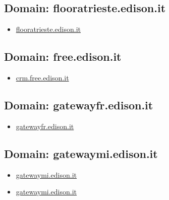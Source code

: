 \documentclass{article}
\begin{document}
    \subsection{Domain: flooratrieste.edison.it}
    \begin{itemize}
        
            
                
                \item \href{ http://flooratrieste.edison.it/}{ flooratrieste.edison.it }
            
        
    \end{itemize}

    \subsection{Domain: free.edison.it}
    \begin{itemize}
        
            
                
                \item \href{ http://crm.free.edison.it/}{ crm.free.edison.it }
            
        
    \end{itemize}

    \subsection{Domain: gatewayfr.edison.it}
    \begin{itemize}
        
            
                
                \item \href{ http://gatewayfr.edison.it/}{ gatewayfr.edison.it }
            
        
    \end{itemize}

    \subsection{Domain: gatewaymi.edison.it}
    \begin{itemize}
        
            
                
                \item \href{ http://gatewaymi.edison.it/}{ gatewaymi.edison.it }
            
                
                \item \href{ https://gatewaymi.edison.it/logon/LogonPoint/index.html}{ gatewaymi.edison.it }
            
        
    \end{itemize}
\end{document}
